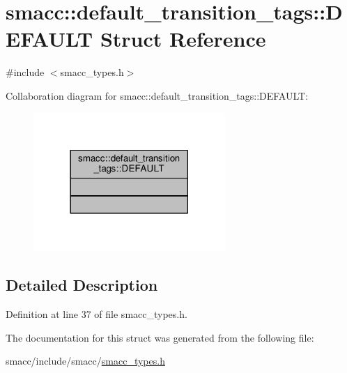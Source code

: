 \hypertarget{structsmacc_1_1default__transition__tags_1_1DEFAULT}{}\section{smacc\+:\+:default\+\_\+transition\+\_\+tags\+:\+:D\+E\+F\+A\+U\+LT Struct Reference}
\label{structsmacc_1_1default__transition__tags_1_1DEFAULT}


{\ttfamily \#include $<$smacc\+\_\+types.\+h$>$}



Collaboration diagram for smacc\+:\+:default\+\_\+transition\+\_\+tags\+:\+:D\+E\+F\+A\+U\+LT\+:\nopagebreak
\begin{figure}[H]
\begin{center}
\leavevmode
\includegraphics[width=206pt]{structsmacc_1_1default__transition__tags_1_1DEFAULT__coll__graph}
\end{center}
\end{figure}


\subsection{Detailed Description}


Definition at line 37 of file smacc\+\_\+types.\+h.



The documentation for this struct was generated from the following file\+:\begin{DoxyCompactItemize}
\item 
smacc/include/smacc/\hyperlink{smacc__types_8h}{smacc\+\_\+types.\+h}\end{DoxyCompactItemize}
